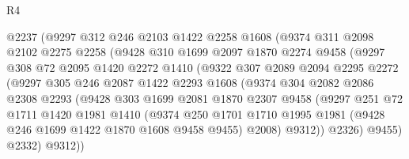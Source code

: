 \begin{lexlean}{R4}
\begin{coremodule}
                  @2237
                  (@9297
                    @312
                    @246
                    @2103
                    @1422
                    @2258
                    @1608
                    (@9374
                      @311
                      @2098
                      @2102
                      @2275
                      @2258
                      (@9428
                        @310
                        @1699
                        @2097
                        @1870
                        @2274
                        @9458
                        (@9297
                          @308
                          @72
                          @2095
                          @1420
                          @2272
                          @1410
                          (@9322
                            @307
                            @2089
                            @2094
                            @2295
                            @2272
                            (@9297
                              @305
                              @246
                              @2087
                              @1422
                              @2293
                              @1608
                              (@9374
                                @304
                                @2082
                                @2086
                                @2308
                                @2293
                                (@9428
                                  @303
                                  @1699
                                  @2081
                                  @1870
                                  @2307
                                  @9458
                                  (@9297
                                    @251
                                    @72
                                    @1711
                                    @1420
                                    @1981
                                    @1410
                                    (@9374
                                      @250
                                      @1701
                                      @1710
                                      @1995
                                      @1981
                                      (@9428 @246 @1699 @1422 @1870 @1608 @9458 @9455)
                                      @2008)
                                    @9312))
                                @2326)
                              @9455)
                            @2332)
                          @9312))

\end{coremodule}
\end{lexlean}
